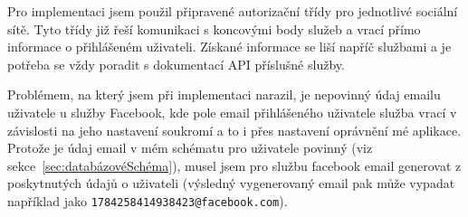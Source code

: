 Pro implementaci jsem použil připravené autorizační třídy pro jednotlivé sociální sítě.
Tyto třídy již řeší komunikaci s koncovými body služeb a vrací přímo informace o přihlášeném uživateli.
Získané informace se liší napříč službami a je potřeba se vždy poradit s dokumentací \gls{API} příslušné služby.

Problémem, na který jsem při implementaci narazil, je nepovinný údaj emailu uživatele u služby Facebook, kde pole email přihlášeného uživatele služba vrací v závislosti na jeho nastavení soukromí a to i přes nastavení oprávnění mé aplikace.
Protože je údaj email v mém schématu pro uživatele povinný (viz sekce~\ref{sec:databázovéSchéma}), musel jsem pro službu facebook email generovat z poskytnutých údajů o uživateli (výsledný vygenerovaný email pak může vypadat například jako \texttt{1784258414938423@facebook.com}).

